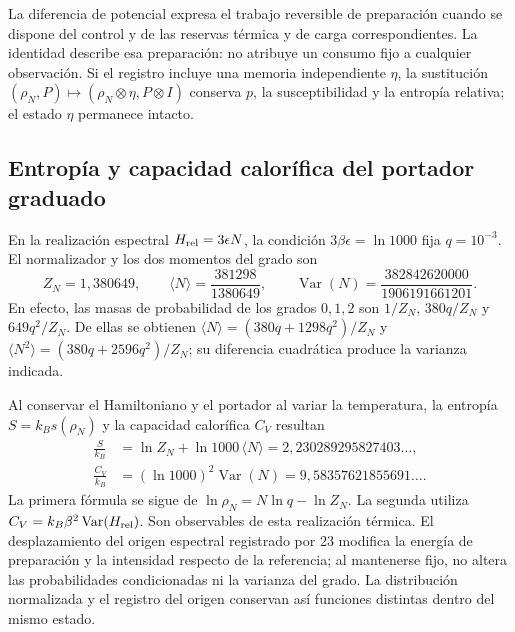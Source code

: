 La diferencia de potencial expresa el trabajo reversible de preparación
cuando se dispone del control y de las reservas térmica y de carga
correspondientes. La identidad describe esa preparación: no atribuye un
consumo fijo a cualquier observación. Si el registro incluye una memoria
independiente $\eta$, la sustitución
$(\rho_N,P)\mapsto(\rho_N\otimes\eta,P\otimes I)$ conserva $p$, la
susceptibilidad y la entropía relativa; el estado $\eta$ permanece intacto.

\subsection{Entropía y capacidad calorífica del portador graduado}
\label{sec:termica-ejemplo-calorifico-recuperado}

En la realización espectral $H_{\rm rel}=3\epsilon N$, la condición
$3\beta\epsilon=\ln1000$ fija $q=10^{-3}$. El normalizador y los dos
momentos del grado son
\[
 Z_N=1{,}380649,\qquad
 \langle N\rangle=\frac{381298}{1380649},\qquad
 \operatorname{Var}(N)=\frac{382842620000}{1906191661201}.
\]
En efecto, las masas de probabilidad de los grados $0,1,2$ son
$1/Z_N$, $380q/Z_N$ y $649q^2/Z_N$. De ellas se obtienen
$\langle N\rangle=(380q+1298q^2)/Z_N$ y
$\langle N^2\rangle=(380q+2596q^2)/Z_N$; su diferencia cuadrática
produce la varianza indicada.

Al conservar el Hamiltoniano y el portador al variar la temperatura,
la entropía $S=k_Bs(\rho_N)$ y la capacidad calorífica $C_V$ resultan
\begin{align*}
 \frac{S}{k_B}
 &=\ln Z_N+\ln1000\,\langle N\rangle
   =2{,}230289295827403\ldots,\\
 \frac{C_V}{k_B}
 &=(\ln1000)^2\operatorname{Var}(N)
   =9{,}58357621855691\ldots.
\end{align*}
La primera fórmula se sigue de $\ln\rho_N=N\ln q-\ln Z_N$.
La segunda utiliza $C_V=k_B\beta^2\operatorname{Var}(H_{\rm rel})$.
Son observables de esta realización térmica. El desplazamiento del origen
espectral registrado por $23$ modifica la energía de preparación y la
intensidad respecto de la referencia; al mantenerse fijo, no altera las
probabilidades condicionadas ni la varianza del grado. La distribución
normalizada y el registro del origen conservan así funciones distintas
dentro del mismo estado.
